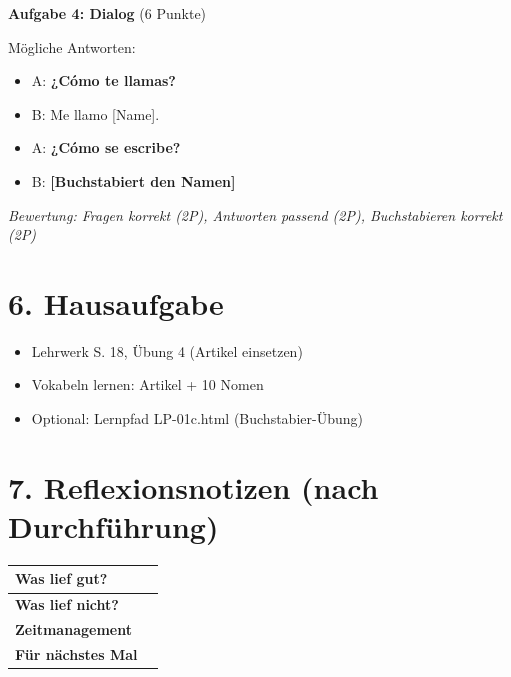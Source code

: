 \documentclass[11pt, a4paper]{article}
\newcommand{\sequenz}{01}
\newcommand{\block}{c}
\newcommand{\loesung}[1]{\textcolor{loesung}{\textbf{#1}}}
\begin{document}
\textbf{Aufgabe 4: Dialog} (6 Punkte)

Mögliche Antworten:
\begin{itemize}
    \item A: \loesung{¿Cómo te llamas?}
    \item B: Me llamo [Name].
    \item A: \loesung{¿Cómo se escribe?}
    \item B: \loesung{[Buchstabiert den Namen]}
\end{itemize}

\textit{Bewertung: Fragen korrekt (2P), Antworten passend (2P), Buchstabieren korrekt (2P)}


\section*{6. Hausaufgabe}

\begin{itemize}
    \item Lehrwerk S. 18, Übung 4 (Artikel einsetzen)
    \item Vokabeln lernen: Artikel + 10 Nomen
    \item Optional: Lernpfad LP-\sequenz\block.html (Buchstabier-Übung)
\end{itemize}


\section*{7. Reflexionsnotizen (nach Durchführung)}

\begin{tabularx}{\textwidth}{|l|X|}
\hline
\textbf{Was lief gut?} & \\[2em]
\hline
\textbf{Was lief nicht?} & \\[2em]
\hline
\textbf{Zeitmanagement} & \\[2em]
\hline
\textbf{Für nächstes Mal} & \\[2em]
\hline
\end{tabularx}
\end{document}

